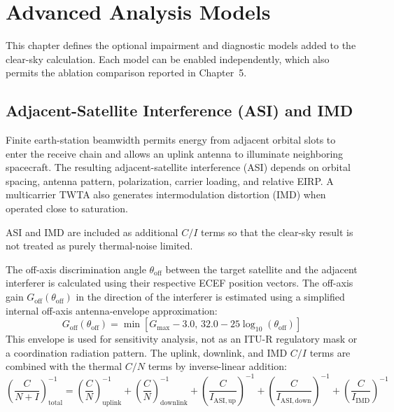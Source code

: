 
\section{Advanced Analysis Models}

This chapter defines the optional impairment and diagnostic models added to the clear-sky calculation. Each model can be enabled independently, which also permits the ablation comparison reported in Chapter~5.

\subsection{Adjacent-Satellite Interference (ASI) and IMD}
Finite earth-station beamwidth permits energy from adjacent orbital slots to enter the receive chain and allows an uplink antenna to illuminate neighboring spacecraft. The resulting adjacent-satellite interference (ASI) depends on orbital spacing, antenna pattern, polarization, carrier loading, and relative EIRP. A multicarrier TWTA also generates intermodulation distortion (IMD) when operated close to saturation.

ASI and IMD are included as additional $C/I$ terms so that the clear-sky result is not treated as purely thermal-noise limited.

The off-axis discrimination angle $\theta_{\mathrm{off}}$ between the target satellite and the adjacent interferer is calculated using their respective ECEF position vectors. The off-axis gain $G_{\mathrm{off}}(\theta_{\mathrm{off}})$ in the direction of the interferer is estimated using a simplified internal off-axis antenna-envelope approximation:
\begin{equation}
    G_{\mathrm{off}}(\theta_{\mathrm{off}})
    =
    \min\left[
    G_{\mathrm{max}} - 3.0,\,
    32.0 - 25\log_{10}(\theta_{\mathrm{off}})
    \right]
\end{equation}
This envelope is used for sensitivity analysis, not as an ITU-R regulatory mask or a coordination radiation pattern. The uplink, downlink, and IMD $C/I$ terms are combined with the thermal $C/N$ terms by inverse-linear addition:
\begin{equation}
    \left(\frac{C}{N+I}\right)_{\mathrm{total}}^{-1}
    =
    \left(\frac{C}{N}\right)_{\mathrm{uplink}}^{-1}
    +
    \left(\frac{C}{N}\right)_{\mathrm{downlink}}^{-1}
    +
    \left(\frac{C}{I_{\mathrm{ASI,up}}}\right)^{-1}
    +
    \left(\frac{C}{I_{\mathrm{ASI,down}}}\right)^{-1}
    +
    \left(\frac{C}{I_{\mathrm{IMD}}}\right)^{-1}
\end{equation}

